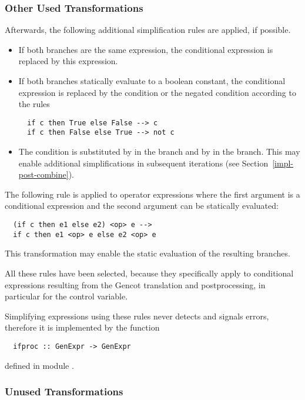 \subsubsection{Other Used Transformations}

Afterwards, the following additional simplification rules are applied, if possible.
\begin{itemize}
\item If both branches are the same expression, the conditional expression is replaced by this expression.
\item If both branches statically evaluate to a boolean constant, the conditional expression is replaced
by the condition or the negated condition according to the rules
\begin{verbatim}
  if c then True else False --> c
  if c then False else True --> not c
\end{verbatim}
\item The condition is substituted by  in the  branch and by  in the  branch. This 
may enable additional simplifications in subsequent iterations (see Section~\ref{impl-post-combine}).
\end{itemize}

The following rule is applied to operator expressions where the first argument is a conditional expression and the second argument
can be statically evaluated:
\begin{verbatim}
  (if c then e1 else e2) <op> e -->
  if c then e1 <op> e else e2 <op> e
\end{verbatim}
This transformation may enable the static evaluation of the resulting branches. 

All these rules have been selected, because they specifically apply to conditional expressions resulting from the Gencot translation
and postprocessing, in particular for the control variable.

Simplifying  expressions using these rules never detects and signals errors, therefore it is implemented by the function
\begin{verbatim}
  ifproc :: GenExpr -> GenExpr
\end{verbatim}
defined in module .

\subsubsection{Unused Transformations}

